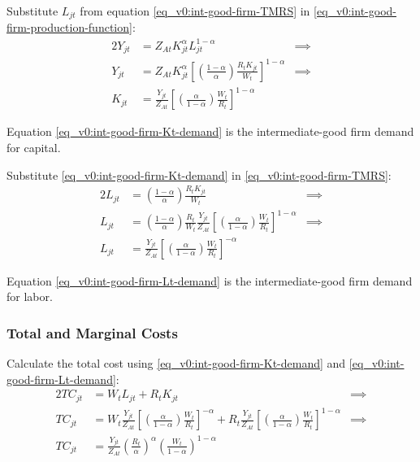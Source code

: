 \documentclass[
thesis.tex
]{subfiles}
\begin{document}
	Substitute $L_{jt}$ from equation \ref{eq_v0:int-good-firm-TMRS} in \ref{eq_v0:int-good-firm-production-function}:
	\begin{alignat}{2}
		Y_{jt} & = Z_{At} K_{jt}^\alpha L_{jt}^{1-\alpha} &\implies \nonumber \\
		Y_{jt} & = Z_{At} K_{jt}^\alpha \left[ \left( \frac{1-\alpha}{\alpha} \right) \frac{R_t K_{jt}}{W_t} \right]^{1-\alpha} &\implies \nonumber \\
		K_{jt} & = \frac{Y_{jt}}{Z_{At}} \left[ \left( \frac{\alpha}{1-\alpha} \right) \frac{W_t}{R_t}\right]^{1-\alpha} \label{eq_v0:int-good-firm-Kt-demand}
	\end{alignat}
	
	Equation \ref{eq_v0:int-good-firm-Kt-demand} is the intermediate-good firm demand for capital. 
	
	Substitute \ref{eq_v0:int-good-firm-Kt-demand} in \ref{eq_v0:int-good-firm-TMRS}:
	\begin{alignat}{2}
		L_{jt} & = \left( \frac{1-\alpha}{\alpha} \right) \frac{R_t K_{jt}}{W_t} &\implies \nonumber \\
		L_{jt} & = \left( \frac{1-\alpha}{\alpha} \right) \frac{R_t}{W_t} \frac{Y_{jt}}{Z_{At}} \left[ \left( \frac{\alpha}{1-\alpha} \right) \frac{W_t}{R_t}\right]^{1-\alpha} &\implies \nonumber \\
		L_{jt} & = \frac{Y_{jt}}{Z_{At}} \left[ \left( \frac{\alpha}{1-\alpha} \right) \frac{W_t}{R_t}\right]^{-\alpha} \label{eq_v0:int-good-firm-Lt-demand}
	\end{alignat}
	
	Equation \ref{eq_v0:int-good-firm-Lt-demand} is the intermediate-good firm demand for labor.
	
	\subsubsection*{Total and Marginal Costs}
	
	Calculate the total cost using \ref{eq_v0:int-good-firm-Kt-demand} and \ref{eq_v0:int-good-firm-Lt-demand}:
	\begin{alignat}{2}
		TC_{jt} & = W_t L_{jt} + R_t K_{jt} &\implies \nonumber \\
		TC_{jt} & = W_t \frac{Y_{jt}}{Z_{At}} \left[ \left( \frac{\alpha}{1-\alpha} \right) \frac{W_t}{R_t} \right]^{-\alpha} + R_t \frac{Y_{jt}}{Z_{At}} \left[ \left( \frac{\alpha}{1-\alpha} \right) \frac{W_t}{R_t} \right]^{1-\alpha} &\implies \nonumber \\
		TC_{jt} & = \frac{Y_{jt}}{Z_{At}} \left( \frac{R_t}{\alpha} \right)^{\alpha} \left( \frac{W_t}{1-\alpha} \right)^{1-\alpha} \label{eq_v0:int-good-firm-TC}
	\end{alignat}
	
\end{document}
